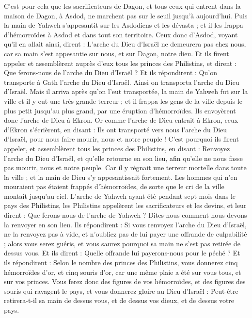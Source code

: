 \begin{multicols}{2}
C'est pour cela que les sacrificateurs de Dagon, et tous ceux qui entrent dans la maison de Dagon, à Asdod, ne marchent pas sur le seuil jusqu'à aujourd'hui.
Puis la main de Yahweh s'appesantit sur les Asdodiens et les dévasta ; et il les frappa d’hémorroïdes à Asdod et dans tout son territoire.
Ceux donc d'Asdod, voyant qu'il en allait ainsi, dirent : L'arche du Dieu d'Israël ne demeurera pas chez nous, car sa main s’est appesantie sur nous, et sur Dagon, notre dieu.
Et ils firent appeler et assemblèrent auprès d’eux tous les princes des Philistins, et dirent : Que ferons-nous de l'arche du Dieu d'Israël ? Et ils répondirent : Qu'on transporte à Gath l'arche du Dieu d'Israël. Ainsi on transporta l'arche du Dieu d'Israël.
Mais il arriva après qu'on l'eut transportée, la main de Yahweh fut sur la ville et il y eut une très grande terreur ; et il frappa les gens de la ville depuis le plus petit jusqu'au plus grand, par une éruption d’hémorroïdes.
Ils envoyèrent donc l'arche de Dieu à Ekron. Or comme l'arche de Dieu entrait à Ekron, ceux d’Ekron s'écrièrent, en disant : Ils ont transporté vers nous l'arche du Dieu d'Israël, pour nous faire mourir, nous et notre peuple !
C'est pourquoi ils firent appeler, et assemblèrent tous les princes des Philistins, en disant : Renvoyez l'arche du Dieu d'Israël, et qu'elle retourne en son lieu, afin qu'elle ne nous fasse pas mourir, nous et notre peuple. Car il y régnait une terreur mortelle dans toute la ville ; et la main de Dieu s’y appesantissait fortement.
Les hommes qui n'en mouraient pas étaient frappés d’hémorroïdes, de sorte que le cri de la ville montait jusqu'au ciel.
\VerseOne{}L'arche de Yahweh ayant été pendant sept mois dans le pays des Philistins,
les Philistins appelèrent les sacrificateurs et les devins, et leur dirent : Que ferons-nous de l'arche de Yahweh ? Dites-nous comment nous devons la renvoyer en son lieu.
Ils répondirent : Si vous renvoyez l'arche du Dieu d'Israël, ne la renvoyez pas à vide, et n’oubliez pas de lui payer une offrande de culpabilité ; alors vous serez guéris, et vous saurez pourquoi sa main ne s’est pas retirée de dessus vous.
Et ils dirent : Quelle offrande lui payerons-nous pour le péché ? Et ils répondirent : Selon le nombre des princes des Philistins, vous donnerez cinq hémorroïdes d'or, et cinq souris d'or, car une même plaie a été sur vous tous, et sur vos princes.
Vous ferez donc des figures de vos hémorroïdes, et des figures des souris qui ravagent le pays, et vous donnerez gloire au Dieu d'Israël : Peut-être retirera-t-il sa main de dessus vous, et de dessus vos dieux, et de dessus votre pays.

\end{multicols}

